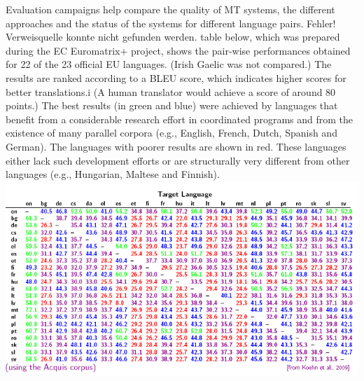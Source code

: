 \documentclass[]{../metanetpaper}
\begin{document}
Evaluation campaigns help compare the quality of MT systems, the different approaches and the status of the systems for different language pairs. Fehler! Verweisquelle konnte nicht gefunden werden. table below, which was prepared during the EC Euromatrix+ project, shows the pair-wise performances obtained for 22 of the 23 official EU languages. (Irish Gaelic was not compared.) The results are ranked according to a BLEU score, which indicates higher scores for better translations.i (A human translator would achieve a score of around 80 points.) 
The best results (in green and blue) were achieved by languages that benefit from a considerable research effort in coordinated programs and from the existence of many parallel corpora (e.g., English, French, Dutch, Spanish and German). The languages with poorer results are shown in red. These languages either lack such development efforts or are structurally very different from other languages (e.g., Hungarian, Maltese and Finnish).\\
\includegraphics[scale=0.5]{media/grit.png}
\end{document}
